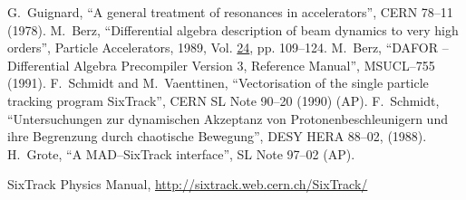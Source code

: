 \begin{thebibliography}{99}
      G.~Guignard, ``A general treatment of resonances in accelerators'',
      CERN 78--11 (1978).  
     M.~Berz, ``Differential
      algebra description of beam dynamics to very high orders'', Particle
      Accelerators, 1989, Vol. \underline{24}, pp. 109--124.
     M.~Berz, ``DAFOR -- Differential Algebra Precompiler
      Version 3, Reference Manual'', MSUCL--755 (1991).
     F.~Schmidt and M.~Vaenttinen, ``Vectorisation of the
      single particle tracking program SixTrack'', CERN SL Note 90--20
      (1990) (AP).  
     F.~Schmidt, ``Untersuchungen zur dynamischen
      Akzeptanz von Protonenbeschleunigern und ihre Begrenzung durch
      chaotische Bewegung'', DESY HERA 88--02, (1988).  
     H.~Grote, ``A MAD--SixTrack interface'', SL Note
      97--02 (AP).  
    
     SixTrack Physics Manual, \url{http://sixtrack.web.cern.ch/SixTrack/}
    

\end{thebibliography}
